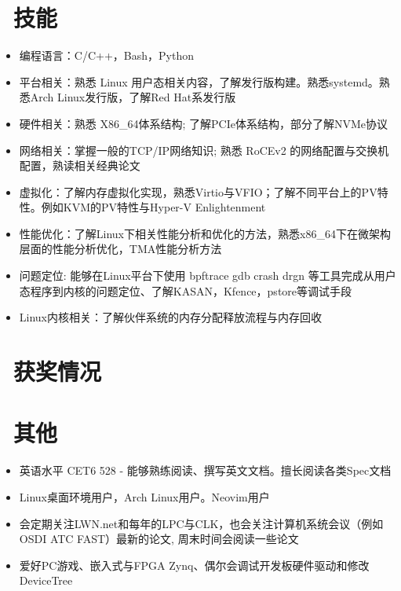 \documentclass{resume}
\begin{document}
\section{\faCogs\ 技能}
\begin{itemize}[parsep=0.5ex]
  \item 编程语言：C/C++，Bash，Python
  \item 平台相关：熟悉 Linux 用户态相关内容，了解发行版构建。熟悉systemd。熟悉Arch Linux发行版，了解Red Hat系发行版
  \item 硬件相关：熟悉 X86\_64体系结构; 了解PCIe体系结构，部分了解NVMe协议
  \item 网络相关：掌握一般的TCP/IP网络知识; 熟悉 RoCEv2 的网络配置与交换机配置，熟读相关经典论文
  \item 虚拟化：了解内存虚拟化实现，熟悉Virtio与VFIO；了解不同平台上的PV特性。例如KVM的PV特性与Hyper-V Enlightenment
  \item 性能优化：了解Linux下相关性能分析和优化的方法，熟悉x86\_64下在微架构层面的性能分析优化，TMA性能分析方法
  \item 问题定位: 能够在Linux平台下使用 bpftrace gdb crash drgn 等工具完成从用户态程序到内核的问题定位、了解KASAN，Kfence，pstore等调试手段
  \item Linux内核相关：了解伙伴系统的内存分配释放流程与内存回收
\end{itemize}


\section{\faHeartO\ 获奖情况}


\section{\faInfo\ 其他}
\begin{itemize}[parsep=0.5ex]
  \item 英语水平 CET6 528 - 能够熟练阅读、撰写英文文档。擅长阅读各类Spec文档
  \item Linux桌面环境用户，Arch Linux用户。Neovim用户
  \item 会定期关注LWN.net和每年的LPC与CLK，也会关注计算机系统会议（例如OSDI ATC FAST）最新的论文, 周末时间会阅读一些论文
  \item 爱好PC游戏、嵌入式与FPGA Zynq、偶尔会调试开发板硬件驱动和修改DeviceTree

\end{itemize}

%
%
\end{document}
